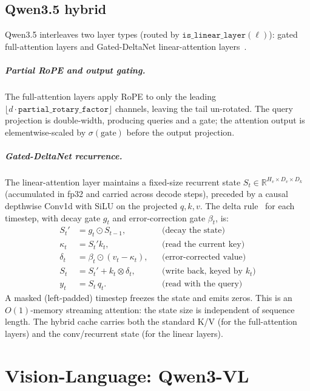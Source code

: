 \documentclass[11pt,a4paper]{report}
\newcommand{\R}{\mathbb{R}}
\newcommand{\code}[1]{\texttt{#1}}
\newcommand{\elemmul}{\odot}
\begin{document}
\section{Qwen3.5 hybrid}
Qwen3.5 interleaves two layer types (routed by
$\code{is\_linear\_layer}(\ell)$): gated full-attention layers and Gated-DeltaNet
linear-attention layers~\citep{yang2024gateddeltanet}.

\paragraph{Partial RoPE and output gating.} The full-attention layers apply RoPE to
only the leading $\lfloor d\cdot\texttt{partial\_rotary\_factor}\rfloor$ channels,
leaving the tail un-rotated. The query projection is double-width, producing queries
and a gate; the attention output is elementwise-scaled by $\sigma(\text{gate})$
before the output projection.

\paragraph{Gated-DeltaNet recurrence.} The linear-attention layer maintains a
fixed-size recurrent state $S_t \in \R^{H_v\times D_v\times D_k}$ (accumulated in
fp32 and carried across decode steps), preceded by a causal depthwise Conv1d with
SiLU on the projected $q,k,v$. The delta rule~\citep{schlag2021deltanet} for each
timestep, with decay gate $g_t$ and error-correction gate $\beta_t$, is:
\begin{align}
  S_t' &= g_t \elemmul S_{t-1}, &&\text{(decay the state)}\\
  \kappa_t &= S_t' k_t, &&\text{(read the current key)}\\
  \delta_t &= \beta_t \elemmul (v_t - \kappa_t), &&\text{(error-corrected value)}\\
  S_t &= S_t' + k_t \otimes \delta_t, &&\text{(write back, keyed by } k_t)\\
  y_t &= S_t\, q_t. &&\text{(read with the query)}
\end{align}
A masked (left-padded) timestep freezes the state and emits zeros. This is an
$O(1)$-memory streaming attention: the state size is independent of sequence length.
The hybrid cache carries both the standard K/V (for the full-attention layers) and
the conv/recurrent state (for the linear layers).

\chapter{Vision-Language: Qwen3-VL}
\label{ch:vision}
\end{document}
